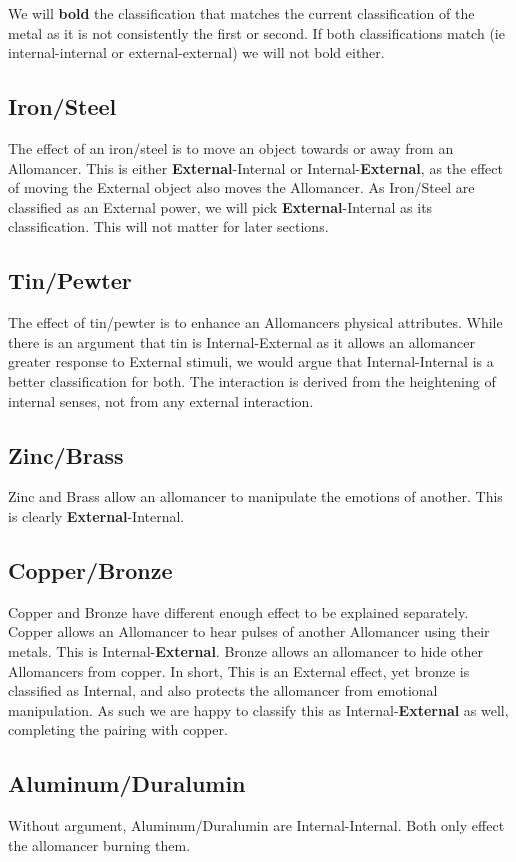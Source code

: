 \documentclass[conference]{IEEEtran}
\begin{document}
We will \textbf{bold} the classification that matches the current classification of the metal as it is not consistently the first or second.  If both classifications match (ie internal-internal or external-external) we will not bold either.
\subsection*{Iron/Steel}
The effect of an iron/steel is to move an object towards or away from an Allomancer.  This is either \textbf{External}-Internal or Internal-\textbf{External}, as the effect of moving the External object also moves the Allomancer.
As Iron/Steel are classified as an External power, we will pick \textbf{External}-Internal as its classification.  This will not matter for later sections.

\subsection*{Tin/Pewter}
The effect of tin/pewter is to enhance an Allomancers physical attributes.  While there is an argument that tin is Internal-External as it allows an allomancer greater response to External stimuli, we would argue that Internal-Internal is a better classification for both.  The interaction is derived from the heightening of internal senses, not from any external interaction.
\subsection*{Zinc/Brass}
Zinc and Brass allow an allomancer to manipulate the emotions of another.  This is clearly \textbf{External}-Internal.
\subsection*{Copper/Bronze}
Copper and Bronze have different enough effect to be explained separately.  Copper allows an Allomancer to hear pulses of another Allomancer using their metals.  This is Internal-\textbf{External}.
Bronze allows an allomancer to hide other Allomancers from copper.  In short, This is an External effect, yet bronze is classified as Internal, and also protects the allomancer from emotional manipulation.  As such we are happy to classify this as Internal-\textbf{External} as well, completing the pairing with copper.
\subsection*{Aluminum/Duralumin}
Without argument, Aluminum/Duralumin are Internal-Internal.  Both only effect the allomancer burning them.
\end{document}
